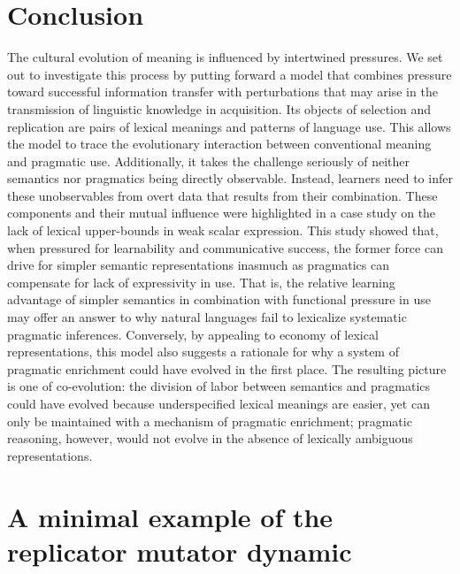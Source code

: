 \documentclass[a4paper, 11pt]{article}
\theoremstyle{Satz}
\begin{document}
\section{Conclusion}
The cultural evolution of meaning is influenced by intertwined pressures. We set out to
investigate this process by putting forward a model that combines pressure toward successful
information transfer with perturbations that may arise in the transmission of linguistic
knowledge in acquisition. Its objects of selection and replication are pairs of lexical
meanings and patterns of language use. This allows the model to trace the evolutionary
interaction between conventional meaning and pragmatic use. Additionally, it takes the
challenge seriously of neither semantics nor pragmatics being directly observable. Instead,
learners need to infer these unobservables from overt data that results from their combination.
These components and their mutual influence were highlighted in a case study on the lack of
lexical upper-bounds in weak scalar expression. This study showed that, when pressured for
learnability and communicative success, the former force can drive for simpler semantic
representations inasmuch as pragmatics can compensate for lack of expressivity in use. That is,
the relative learning advantage of simpler semantics in combination with functional pressure in
use may offer an answer to why natural languages fail to lexicalize systematic pragmatic
inferences. Conversely, by appealing to economy of lexical representations, this model also
suggests a rationale for why a system of pragmatic enrichment could have evolved in the first
place. The resulting picture is one of co-evolution: the division of labor between semantics
and pragmatics could have evolved because underspecified lexical meanings are easier, yet can
only be maintained with a mechanism of pragmatic enrichment; pragmatic reasoning, however,
would not evolve in the absence of lexically ambiguous representations.

\appendix

\section{A minimal example of the replicator mutator dynamic}
\label{sec:minim-example-repl}
\end{document}
